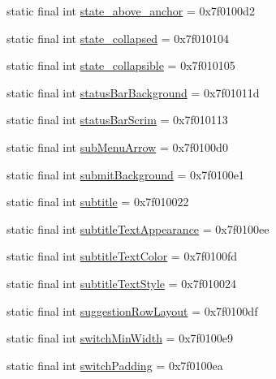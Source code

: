 \begin{CompactItemize}
\item 
static final int \hyperlink{classandroid_1_1support_1_1mediacompat_1_1_r_1_1attr_64d692a8fda5f907c7d3f4f98c71d256}{state\_\-above\_\-anchor} = 0x7f0100d2
\item 
static final int \hyperlink{classandroid_1_1support_1_1mediacompat_1_1_r_1_1attr_11cad78d6f80ff0482073ebd710b21c7}{state\_\-collapsed} = 0x7f010104
\item 
static final int \hyperlink{classandroid_1_1support_1_1mediacompat_1_1_r_1_1attr_4e10cbe5c621530d2bca6ab818a22f49}{state\_\-collapsible} = 0x7f010105
\item 
static final int \hyperlink{classandroid_1_1support_1_1mediacompat_1_1_r_1_1attr_9b003c576065f37fc45fa9dd46e17a5b}{statusBarBackground} = 0x7f01011d
\item 
static final int \hyperlink{classandroid_1_1support_1_1mediacompat_1_1_r_1_1attr_46063e5b0649a47d888a9a088763397f}{statusBarScrim} = 0x7f010113
\item 
static final int \hyperlink{classandroid_1_1support_1_1mediacompat_1_1_r_1_1attr_a6bd9ac6c609915ee4e7b977a785ebc7}{subMenuArrow} = 0x7f0100d0
\item 
static final int \hyperlink{classandroid_1_1support_1_1mediacompat_1_1_r_1_1attr_b3f0c9e73f890373064364b5b7d33c14}{submitBackground} = 0x7f0100e1
\item 
static final int \hyperlink{classandroid_1_1support_1_1mediacompat_1_1_r_1_1attr_d3b42961b36ff2507ace8103d07f7709}{subtitle} = 0x7f010022
\item 
static final int \hyperlink{classandroid_1_1support_1_1mediacompat_1_1_r_1_1attr_67d49de1687f554f362771806c5bd3fd}{subtitleTextAppearance} = 0x7f0100ee
\item 
static final int \hyperlink{classandroid_1_1support_1_1mediacompat_1_1_r_1_1attr_907ddafc440daf0129b5e3548b690524}{subtitleTextColor} = 0x7f0100fd
\item 
static final int \hyperlink{classandroid_1_1support_1_1mediacompat_1_1_r_1_1attr_36d770aba70f1eeae454e655beedcad6}{subtitleTextStyle} = 0x7f010024
\item 
static final int \hyperlink{classandroid_1_1support_1_1mediacompat_1_1_r_1_1attr_63b5f38d06bb08f5b12ad8a235f543d4}{suggestionRowLayout} = 0x7f0100df
\item 
static final int \hyperlink{classandroid_1_1support_1_1mediacompat_1_1_r_1_1attr_97a13eff50ce3da41332ae2809e04666}{switchMinWidth} = 0x7f0100e9
\item 
static final int \hyperlink{classandroid_1_1support_1_1mediacompat_1_1_r_1_1attr_48b558210e844125a219098faef95c01}{switchPadding} = 0x7f0100ea

\end{CompactItemize}
